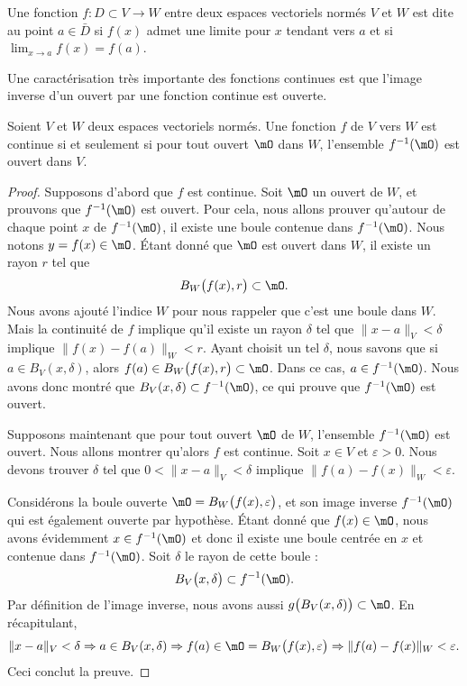 \begin{definition}\label{DefContDansEVN}
	Une fonction $f\colon D\subset V\to W$ entre deux espaces vectoriels normés $V$ et $W$ est dite  au point $a\in\bar D$ si $f(x)$ admet une limite pour $x$ tendant vers $a$ et si $\lim_{x\to a} f(x)=f(a)$.
\end{definition}

Une caractérisation très importante des fonctions continues est que l'image inverse d'un ouvert par une fonction continue est ouverte.

\begin{theorem}		\label{ThoContiueImageInvOUvert}
	Soient $V$ et $W$ deux espaces vectoriels normés. Une fonction $f$ de $V$ vers $W$ est continue si et seulement si pour tout ouvert $\mO$ dans $W$, l'ensemble $f^{-1}(\mO)$ est ouvert dans $V$.
\end{theorem}

\begin{proof}
	Supposons d'abord que $f$ est continue. Soit $\mO$ un ouvert de $W$, et prouvons que $f^{-1}(\mO)$ est ouvert. Pour cela, nous allons prouver qu'autour de chaque point $x$ de $f^{-1}(\mO)$, il existe une boule contenue dans $f^{-1}(\mO)$. Nous notons $y=f(x)\in\mO$. Étant donné que $\mO$ est ouvert dans $W$, il existe un rayon $r$ tel que
	\begin{equation}
		B_W\big( f(x),r \big)\subset\mO.
	\end{equation}
	Nous avons ajouté l'indice $W$ pour nous rappeler que c'est une boule dans $W$. Mais la continuité de $f$ implique qu'il existe un rayon $\delta$ tel que $\| x-a \|_V<\delta$ implique $\big\| f(x)-f(a) \big\|_W<r$. Ayant choisit un tel $\delta$, nous savons que si $a\in B_V(x,\delta)$, alors $f(a)\in B_W\big( f(x),r \big)\subset \mO$. Dans ce cas, $a\in f^{-1}(\mO)$. Nous avons donc montré que $B_V(x,\delta)\subset f^{-1}(\mO)$, ce qui prouve que $f^{-1}(\mO)$ est ouvert.

	Supposons maintenant que pour tout ouvert $\mO$ de $W$, l'ensemble $f^{-1}(\mO)$ est ouvert. Nous allons montrer qu'alors $f$ est continue. Soit $x\in V$ et $\varepsilon>0$. Nous devons trouver $\delta$ tel que $0<\| x-a \|_V<\delta$ implique $\| f(a)-f(x) \|_W<\varepsilon$.

	Considérons la boule ouverte $\mO=B_W\big( f(x),\varepsilon \big)$, et son image inverse $f^{-1}(\mO)$ qui est également ouverte par hypothèse. Étant donné que $f(x)\in\mO$, nous avons évidemment $x\in f^{-1}(\mO)$ et donc il existe une boule centrée en $x$ et contenue dans $f^{-1}(\mO)$. Soit $\delta$ le rayon de cette boule :
	\begin{equation}
		B_V\big( x,\delta \big)\subset f^{-1}(\mO).
	\end{equation}
	Par définition de l'image inverse, nous avons aussi $g\big( B_V(x,\delta) \big)\subset\mO$. En récapitulant,
	\begin{equation}
		\| x-a \|_V<\delta\Rightarrow a\in B_V(x,\delta)\Rightarrow f(a)\in\mO=B_W\big( f(x),\varepsilon \big)\Rightarrow\| f(a)-f(x) \|_W<\varepsilon.
	\end{equation}
	Ceci conclut la preuve.
\end{proof}

